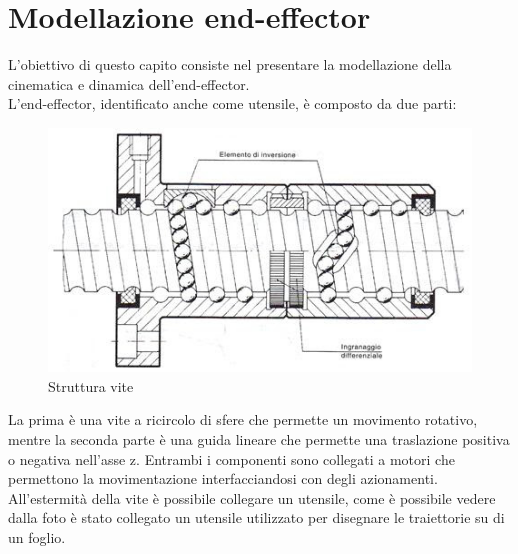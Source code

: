 \section{Modellazione end-effector}
L'obiettivo di questo capito consiste nel presentare la modellazione della cinematica e dinamica dell'end-effector.
\\L'end-effector, identificato anche come utensile, è composto da due parti: 
\begin{figure}[ht]
	\begin{center}
		\includegraphics[scale=0.5]{Immagini/ViteRicircolo}
		\caption{Struttura vite}
	\end{center}
\end{figure}
La prima è una vite a ricircolo di sfere che permette un movimento rotativo, mentre la seconda parte è una guida lineare che permette una traslazione positiva o negativa nell'asse z. Entrambi i componenti sono collegati a motori che permettono la movimentazione interfacciandosi con degli azionamenti. All'estermità della vite è possibile collegare un utensile, come è possibile vedere dalla foto è stato collegato un utensile utilizzato per disegnare le traiettorie su di un foglio.
